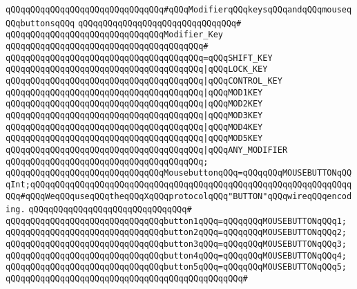 \verb|qQQqqQQqqQQqqQQqqQQqqQQqqQQqqQQq#qQQqModifierqQQqkeysqQQqandqQQqmouseqQQqbuttonsqQQq|\newline
\verb|qQQqqQQqqQQqqQQqqQQqqQQqqQQqqQQq#|\newline
\verb|qQQqqQQqqQQqqQQqqQQqqQQqqQQqqQQqModifier_Key|\newline
\verb|qQQqqQQqqQQqqQQqqQQqqQQqqQQqqQQqqQQqqQQq#|\newline
\verb|qQQqqQQqqQQqqQQqqQQqqQQqqQQqqQQqqQQqqQQq=qQQqSHIFT_KEY|\newline
\verb|qQQqqQQqqQQqqQQqqQQqqQQqqQQqqQQqqQQqqQQq|\verb#|qQQqLOCK_KEY#\newline
\verb|qQQqqQQqqQQqqQQqqQQqqQQqqQQqqQQqqQQqqQQq|\verb#|qQQqCONTROL_KEY#\newline
\verb|qQQqqQQqqQQqqQQqqQQqqQQqqQQqqQQqqQQqqQQq|\verb#|qQQqMOD1KEY#\newline
\verb|qQQqqQQqqQQqqQQqqQQqqQQqqQQqqQQqqQQqqQQq|\verb#|qQQqMOD2KEY#\newline
\verb|qQQqqQQqqQQqqQQqqQQqqQQqqQQqqQQqqQQqqQQq|\verb#|qQQqMOD3KEY#\newline
\verb|qQQqqQQqqQQqqQQqqQQqqQQqqQQqqQQqqQQqqQQq|\verb#|qQQqMOD4KEY#\newline
\verb|qQQqqQQqqQQqqQQqqQQqqQQqqQQqqQQqqQQqqQQq|\verb#|qQQqMOD5KEY#\newline
\verb|qQQqqQQqqQQqqQQqqQQqqQQqqQQqqQQqqQQqqQQq|\verb#|qQQqANY_MODIFIER#\newline
\verb|qQQqqQQqqQQqqQQqqQQqqQQqqQQqqQQqqQQqqQQq;|\newline
\newline
\verb|qQQqqQQqqQQqqQQqqQQqqQQqqQQqqQQqMousebuttonqQQq=qQQqqQQqMOUSEBUTTONqQQqInt;qQQqqQQqqQQqqQQqqQQqqQQqqQQqqQQqqQQqqQQqqQQqqQQqqQQqqQQqqQQqqQQqqQQq#qQQqWeqQQquseqQQqtheqQQqXqQQqprotocolqQQq"BUTTON"qQQqwireqQQqencoding.|\newline
\verb|qQQqqQQqqQQqqQQqqQQqqQQqqQQqqQQq#|\newline
\verb|qQQqqQQqqQQqqQQqqQQqqQQqqQQqqQQqbutton1qQQq=qQQqqQQqMOUSEBUTTONqQQq1;|\newline
\verb|qQQqqQQqqQQqqQQqqQQqqQQqqQQqqQQqbutton2qQQq=qQQqqQQqMOUSEBUTTONqQQq2;|\newline
\verb|qQQqqQQqqQQqqQQqqQQqqQQqqQQqqQQqbutton3qQQq=qQQqqQQqMOUSEBUTTONqQQq3;|\newline
\verb|qQQqqQQqqQQqqQQqqQQqqQQqqQQqqQQqbutton4qQQq=qQQqqQQqMOUSEBUTTONqQQq4;|\newline
\verb|qQQqqQQqqQQqqQQqqQQqqQQqqQQqqQQqbutton5qQQq=qQQqqQQqMOUSEBUTTONqQQq5;|\newline
\verb|qQQqqQQqqQQqqQQqqQQqqQQqqQQqqQQqqQQqqQQqqQQqqQQq#|\newline
